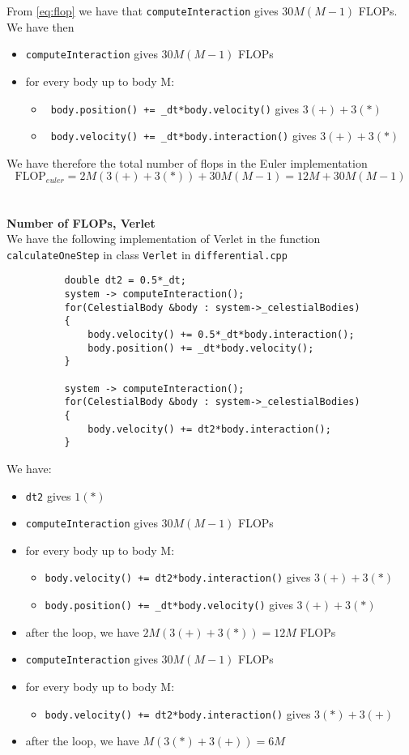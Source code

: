 \documentclass[12pt]{article}
\begin{document}
	 From \ref{eq:flop} we have that \texttt{computeInteraction} gives $30M(M-1)$ FLOPs. We have then
	 \begin{itemize}
	 	\item \texttt{computeInteraction} gives $30M(M-1)$ FLOPs
	 	\item for every body up to body M:
	 	\begin{itemize}
	 		\item \texttt{ body.position() += \_dt*body.velocity()} gives $3(+) + 3(*)$
	 		\item \texttt{  body.velocity() += \_dt*body.interaction()} gives $3(+) + 3(*)$
	 	\end{itemize}
	 \end{itemize}We have therefore the total number of flops in the Euler implementation 
	 \begin{equation*}
	 \text{FLOP}_{euler} = 2M(3(+) + 3(*)) + 30M(M-1) = 12M + 30M(M-1)
	\end{equation*} \\
	 \hfill \\ 
	 \textbf{Number of FLOPs, Verlet} \\ 
	 We have the following implementation of Verlet in the function \texttt{calculateOneStep} in class \texttt{Verlet} in \texttt{differential.cpp}
	 \begin{lstlisting}
	 	  double dt2 = 0.5*_dt;
	 	  system -> computeInteraction();
	 	  for(CelestialBody &body : system->_celestialBodies)
	 	  {
		 	  body.velocity() += 0.5*_dt*body.interaction();
		 	  body.position() += _dt*body.velocity();
	 	  }
	 	  
	 	  system -> computeInteraction();
	 	  for(CelestialBody &body : system->_celestialBodies)
	 	  {
		 	  body.velocity() += dt2*body.interaction();
	 	  }
	 \end{lstlisting}
	 We have:
	 \begin{itemize}
	 	\item \texttt{dt2} gives $1(*)$
	 	\item \texttt{computeInteraction} gives $30M(M-1)$ FLOPs
	 	\item for every body up to body M:
	 	\begin{itemize}
	 		\item \texttt{body.velocity() += dt2*body.interaction()} gives $3(+) + 3(*)$
	 		\item \texttt{body.position() += \_dt*body.velocity()} gives $3(+) + 3(*)$ 
	 	\end{itemize}
	 	\item after the loop, we have $2M(3(+) + 3(*)) = 12M$ FLOPs
	 	\item \texttt{computeInteraction} gives $30M(M-1)$ FLOPs
	 	\item for every body up to body M:
	 	\begin{itemize}
	 		\item \texttt{body.velocity() += dt2*body.interaction()} gives $3(*) + 3(+)$
	 	\end{itemize}
	 	\item after the loop, we have $M(3(*) + 3(+)) = 6M$
	 \end{itemize}
\end{document}
